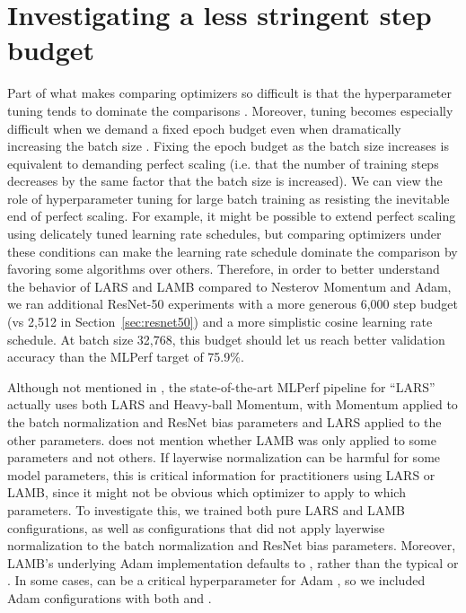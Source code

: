 \documentclass{article}
\begin{document}
 \section{Investigating a less stringent step budget}\label{sec:step_budget}
Part of what makes comparing optimizers so difficult is that the hyperparameter tuning tends to dominate the comparisons \citep{choi2019empirical}. Moreover, tuning becomes especially difficult when we demand a fixed epoch budget even when dramatically increasing the batch size \citep{shallue2019measuring}.
Fixing the epoch budget as the batch size increases is equivalent to demanding perfect scaling (i.e. that the number of training steps decreases by the same factor that the batch size is increased).
We can view the role of hyperparameter tuning for large batch training as resisting the inevitable end of perfect scaling.
For example, it might be possible to extend perfect scaling using delicately tuned learning rate schedules, but comparing optimizers under these conditions can make the learning rate schedule dominate the comparison by favoring some algorithms over others.
Therefore, in order to better understand the behavior of LARS and LAMB compared to Nesterov Momentum and Adam, we ran additional ResNet-50 experiments with a more generous 6,000 step budget (vs 2,512 in Section~\ref{sec:resnet50}) and a more simplistic cosine learning rate schedule. At batch size 32,768, this budget should let us reach better validation accuracy than the MLPerf target of 75.9\%.



Although not mentioned in \citet{you2017lars}, the state-of-the-art MLPerf pipeline for ``LARS'' actually uses both LARS and Heavy-ball Momentum, with Momentum applied to the batch normalization and ResNet bias parameters and LARS applied to the other parameters. \citet{you2019lamb} does not mention whether LAMB was only applied to some parameters and not others.
If layerwise normalization can be harmful for some model parameters, this is critical information for practitioners using LARS or LAMB, since it might not be obvious which optimizer to apply to which parameters.
To investigate this, we trained both pure LARS and LAMB configurations, as well as configurations that did not apply layerwise normalization to the batch normalization and ResNet bias parameters.
Moreover, LAMB's underlying Adam implementation defaults to , rather than the typical  or . In some cases,  can be a critical hyperparameter for Adam \citep{choi2019empirical}, so we included Adam configurations with both  and .
\end{document}
